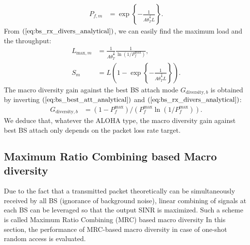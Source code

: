 \begin{align}
\label{eq:bs_rx_divers_analytical}
P_{f,m} 
&= \exp\left\lbrace -\frac{1}{A \theta_{T}^{\frac{2}{\gamma}} L }\right\rbrace.
\end{align}
From $(\ref{eq:bs_rx_divers_analytical})$, we can easily find the maximum load and the throughput:
\begin{align}
	\label{eq:bs_rx_divers_max_load}
	L_{\text{max}, m} &= \frac{1}{A \theta_{T}^{\frac{2}{\gamma}}} \frac{1}{\ln(1/P_{f}^{\text{max}})}, \\
	\label{eq:bs_rx_divers_spatial_throughput}
	S_{m} &= L \left(1 -\exp\left\lbrace -\frac{1}{A \theta_{T}^{\frac{2}{\gamma}} L } \right\rbrace \right). 
\end{align}
The macro diversity gain against the best BS attach mode $G_{\text{diversity},b}$ is obtained by inverting $(\ref{eq:bs_best_att_analytical})$ and $(\ref{eq:bs_rx_divers_analytical})$:
\begin{align}
	\label{eq:macro-diversity-gain}
	G_{\text{diversity},b} &= \left(1-P_{f}^{\text{max}}\right)/ \left( P_{f}^{\text{max}} \ln(1/P_{f}^{\text{max}}) \right) .
\end{align}
We deduce that, whatever the ALOHA type, the macro diversity gain against best BS attach
only depends on the packet loss rate target.

\subsection{Maximum Ratio Combining based Macro diversity}
Due to the fact that a transmitted packet theoretically can be simultaneously received by all BS (ignorance of background noise), linear combining of signals at each BS can be leveraged so that the output SINR is maximized. Such a scheme is called Maximum Ratio Combining (MRC) based macro diversity
In this section, the performance of MRC-based macro diversity in case of one-shot random access is evaluated.


